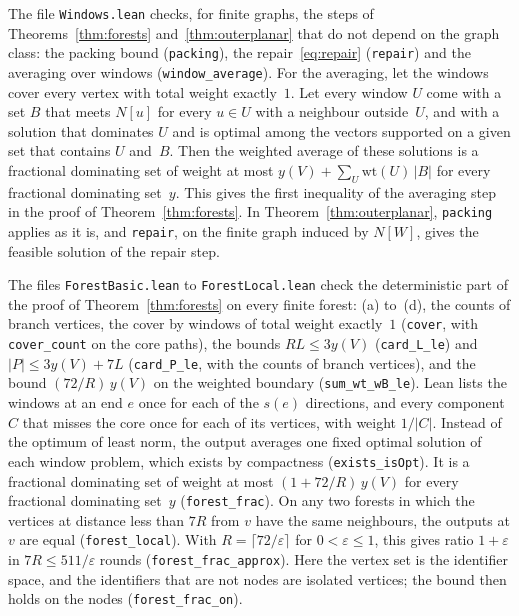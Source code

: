 \documentclass[11pt]{article}
\theoremstyle{remark}
\begin{document}
The file \texttt{Windows.lean} checks, for finite graphs, the steps of Theorems~\ref{thm:forests}
and~\ref{thm:outerplanar} that do not depend on the graph class: the packing bound
(\texttt{packing}), the repair~\eqref{eq:repair} (\texttt{repair}) and the averaging over windows
(\texttt{window\_average}). For the averaging, let the windows cover every vertex with total weight
exactly~$1$. Let every window $U$ come with a set $B$ that meets $N[u]$ for every $u\in U$ with a
neighbour outside~$U$, and with a solution that dominates $U$ and is optimal among the vectors
supported on a given set that contains $U$ and~$B$. Then the weighted average of these solutions is
a fractional dominating set of weight at most $y(V)+\sum_U\mathrm{wt}(U)\,|B|$ for every fractional
dominating set~$y$. This gives the first inequality of the averaging step in the proof of
Theorem~\ref{thm:forests}. In Theorem~\ref{thm:outerplanar}, \texttt{packing} applies as it is, and
\texttt{repair}, on the finite graph induced by $N[W]$, gives the feasible solution of the repair
step.

The files \texttt{ForestBasic.lean} to \texttt{ForestLocal.lean} check the deterministic part of the
proof of Theorem~\ref{thm:forests} on every finite forest: (a) to~(d), the counts of branch vertices,
the cover by windows of total weight exactly~$1$ (\texttt{cover}, with \texttt{cover\_count} on the
core paths), the bounds $RL\le3y(V)$ (\texttt{card\_L\_le}) and $|P|\le3y(V)+7L$
(\texttt{card\_P\_le}, with the counts of branch vertices), and the bound $(72/R)\,y(V)$ on the weighted boundary
(\texttt{sum\_wt\_wB\_le}). Lean lists the windows at an end $e$ once for each of the $s(e)$
directions, and every component $C$ that misses the core once for each of its vertices, with weight
$1/|C|$. Instead of the optimum of least norm, the output averages one fixed optimal solution of each
window problem, which exists by compactness (\texttt{exists\_isOpt}). It is a fractional dominating
set of weight at most $(1+72/R)\,y(V)$ for every fractional dominating set~$y$
(\texttt{forest\_frac}). On any two forests in which the vertices at distance less than $7R$ from $v$
have the same neighbours, the outputs at $v$ are equal (\texttt{forest\_local}). With
$R=\lceil72/\varepsilon\rceil$ for $0<\varepsilon\le1$, this gives ratio $1+\varepsilon$ in
$7R\le511/\varepsilon$ rounds (\texttt{forest\_frac\_approx}). Here the vertex set
is the identifier space, and the identifiers that are not nodes are isolated vertices; the bound then
holds on the nodes (\texttt{forest\_frac\_on}).
\end{document}
